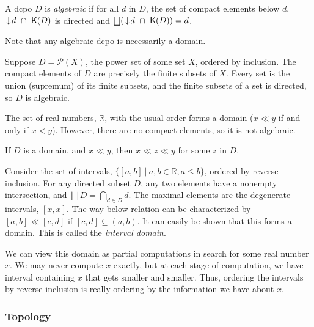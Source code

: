 \begin{definition}
A dcpo $D$ is \emph{algebraic} if for all $d$ in $D$, the set of compact elements below $d$, $\,\downarrow\! d  \ \cap\ \mathsf{K}(D)$ is directed and $\bigsqcup (\da d\ \cap \ \mathsf{K}(D)) = d$.
\end{definition}

Note that any algebraic dcpo is necessarily a domain.

\begin{example}
Suppose $D = \mathcal{P}(X)$, the power set of some set $X$, ordered by inclusion.  The compact elements of $D$ are precisely the finite subsets of $X$.  Every set is the union (supremum) of its finite subsets, and the finite subsets of a set is directed, so $D$ is algebraic.
\end{example}

\begin{example}
The set of real numbers, $\mathbb{R}$, with the usual order forms a domain ($x\ll y$ if and only if $x < y$).  However, there are no compact elements, so it is not algebraic.
\end{example}

\begin{theorem} \label{interpolation}
If $D$ is a domain, and $x\ll y$, then $x\ll z\ll y$ for some $z$ in $D$.
\end{theorem}

\begin{example} \label{intervaldomain}
Consider the set of intervals, $\{[a,b]\ |\ a,b\in \mathbb{R}, a\leq b\}$, ordered by reverse inclusion.  For any directed subset $D$, any two elements have a nonempty intersection, and $\bigsqcup D = \bigcap_{d\in D} d$.  The maximal elements are the degenerate intervals, $[x,x]$.  The way below relation can be characterized by $[a,b] \ll [c,d]$ if $[c,d] \subseteq (a,b)$.  It can easily be shown that this forms a domain.  This is called the \emph{interval domain}.

We can view this domain as partial computations in search for some real number $x$.  We may never compute $x$ exactly, but at each stage of computation, we have interval containing $x$ that gets smaller and smaller.  Thus, ordering the intervals by reverse inclusion is really ordering by the information we have about $x$.
\end{example}

\subsubsection{Topology}

